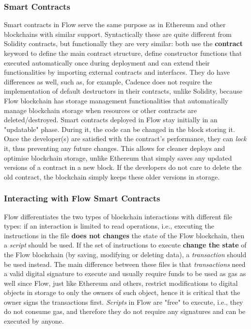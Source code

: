 \documentclass[../NFTComp_IEEE.tex]{subfiles}
\begin{document}
\subsubsection{Smart Contracts}
\label{sec:smart_contracts}
Smart contracts in Flow serve the same purpose as in Ethereum and other blockchains with similar support. Syntactically these are quite different from Solidity contracts, but functionally they are very similar: both use the \textbf{contract} keyword to define the main contract structure, define constructor functions that executed automatically once during deployment and can extend their functionalities by importing external contracts and interfaces. They do have differences as well, such as, for example, Cadence does not require the implementation of default destructors in their contracts, unlike Solidity, because Flow blockchain has storage management functionalities that automatically manage blockchain storage when resources or other contracts are deleted/destroyed. Smart contracts deployed in Flow stay initially in an "updatable" phase. During it, the code can be changed in the block storing it. Once the developer(s) are satisfied with the contract's performance, they can \textit{lock} it, thus preventing any future changes. This allows for cleaner deploys and optimise blockchain storage, unlike Ethereum that simply saves any updated versions of a contract in a new block. If the developers do not care to delete the old contract, the blockchain simply keeps these older versions in storage.

\subsubsection{Interacting with Flow Smart Contracts}
Flow differentiates the two types of blockchain interactions with different file types: if an interaction is limited to read operations, i.e., executing the instructions in the file \textbf{does not changes} the state of the Flow blockchain, then a \textit{script} should be used. If the set of instructions to execute \textbf{change the state} of the Flow blockchain (by saving, modifying or deleting data), a \textit{transaction} should be used instead. The main difference between these files is that \textit{transactions} need a valid digital signature to execute and usually require funds to be used as gas as well since Flow, just like Ethereum and others, restrict modifications to digital objects in storage to only the owners of such object, hence it is critical that the owner signs the transactions first. \textit{Scripts} in Flow are "free" to execute, i.e., they do not consume gas, and therefore they do not require any signatures and can be executed by anyone.
\end{document}
